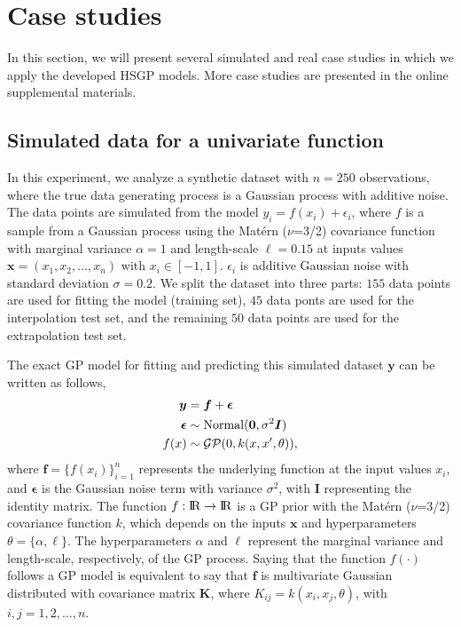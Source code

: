 \section{Case studies}\label{sec_cases}

In this section, we will present several simulated and real case studies in which we apply the developed HSGP models. More case studies are presented in the online supplemental materials.

\subsection{Simulated data for a univariate function}\label{sec_univariate_simu}

In this experiment, we analyze a synthetic dataset with $n = 250$ observations, where the true data generating process is a Gaussian process with additive noise. The data points are simulated from the model $y_i = f(x_i) + \epsilon_i$, where $f$ is a sample from a Gaussian process using the Mat{\'e}rn ($\nu$=3/2) covariance function with marginal variance $\alpha=1$ and length-scale $\ell=0.15$ at inputs values $\bm{x}=(x_1,x_2,\dots,x_n)$ with $x_i \in [-1,1]$. $\epsilon_i$ is additive Gaussian noise with standard deviation $\sigma=0.2$. We split the dataset into three parts: $155$ data points are used for fitting the model (training set), $45$ data ponts are used for the interpolation test set, and the remaining $50$ data points are used for the extrapolation test set.

The exact GP model for fitting and predicting this simulated dataset $\bm{y}$ can be written as follows,
%
\begin{align*}\label{eq_latentgp_simudata1}
\begin{split}
\bm{y} &= \bm{f} + \bm{\epsilon} \\
\bm{\epsilon} &\sim \operatorname{Normal}(\bm{0}, \sigma^2 \bm{I}) \\
f(x) &\sim \operatorname{\mathcal{GP}}(0, k(x, x', \theta)),
\end{split}
\end{align*}
%
where $\bm{f}=\{f(x_i)\}_{i=1}^n$ represents the underlying function at the input values $x_i$, and $\bm{\epsilon}$ is the Gaussian noise term with variance $\sigma^2$, with $\bm{I}$ representing the identity matrix. The function $f:{\rm I\!R} \to {\rm I\!R}$ is a GP prior with the Mat{\'e}rn ($\nu$=3/2) covariance function $k$, which depends on the inputs $\bm{x}$ and hyperparameters $\theta=\{\alpha,\ell\}$. The hyperparameters $\alpha$ and $\ell$ represent the marginal variance and length-scale, respectively, of the GP process. Saying that the function $f(\cdot)$ follows a GP model is equivalent to say that $\bm{f}$ is multivariate Gaussian distributed with covariance matrix $\bm{K}$, where $K_{ij}=k(x_i,x_j,\theta)$, with $i,j=1,2,\dots,n$.
 
